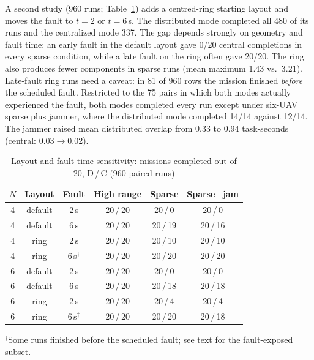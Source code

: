 \documentclass[conference]{IEEEtran}
\begin{document}
A second study (960 runs; Table~\ref{tab:robust}) adds a centred-ring starting
layout and moves the fault to $t=2$ or $t=6$\,s. The distributed mode
completed all 480 of its runs and the centralized mode 337. The gap depends
strongly on geometry and fault time: an early fault in the default layout
gave 0/20 central completions in every sparse condition, while a late fault
on the ring often gave 20/20. The ring also produces fewer components in
sparse runs (mean maximum 1.43 vs.\ 3.21). Late-fault ring runs need a
caveat: in 81 of 960 rows the mission finished \emph{before} the scheduled
fault. Restricted to the 75 pairs in which both modes actually experienced
the fault, both modes completed every run except under six-UAV sparse plus
jammer, where the distributed mode completed 14/14 against 12/14. The jammer raised
mean distributed overlap from 0.33 to 0.94 task-seconds (central:
0.03$\rightarrow$0.02).

\begin{table}[t]
\caption{Layout and fault-time sensitivity: missions completed out of 20,
D\,/\,C (960 paired runs)}
\label{tab:robust}
\centering
\footnotesize
\setlength{\tabcolsep}{4pt}
\begin{tabular}{@{}cccccc@{}}
\toprule
$N$ & Layout & Fault & High range & Sparse & Sparse+jam \\
\midrule
4 & default & 2\,s & 20\,/\,20 & 20\,/\,0  & 20\,/\,0  \\
4 & default & 6\,s & 20\,/\,20 & 20\,/\,19 & 20\,/\,16 \\
4 & ring    & 2\,s & 20\,/\,20 & 20\,/\,10 & 20\,/\,10 \\
4 & ring    & 6\,s$^\dagger$ & 20\,/\,20 & 20\,/\,20 & 20\,/\,20 \\
6 & default & 2\,s & 20\,/\,20 & 20\,/\,0  & 20\,/\,0  \\
6 & default & 6\,s & 20\,/\,20 & 20\,/\,18 & 20\,/\,18 \\
6 & ring    & 2\,s & 20\,/\,20 & 20\,/\,4  & 20\,/\,4  \\
6 & ring    & 6\,s$^\dagger$ & 20\,/\,20 & 20\,/\,20 & 20\,/\,18 \\
\bottomrule
\end{tabular}

\vspace{2pt}
{\scriptsize $^\dagger$Some runs finished before the scheduled fault; see
text for the fault-exposed subset.\par}
\end{table}

\end{document}
